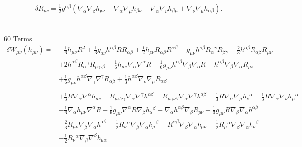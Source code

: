 \documentclass[10pt,letterpaper]{article}
\begin{document}
\begin{equation}
	\delta R_{\mu\nu} = \tfrac{1}{2} g^{\alpha \beta} (\nabla_{\alpha}\nabla_{\beta}h_{\mu \nu} -  \nabla_{\alpha}\nabla_{\mu}h_{\beta \nu} -  \nabla_{\alpha}\nabla_{\nu}h_{\beta \mu} + \nabla_{\nu}\nabla_{\mu}h_{\alpha \beta}).
\end{equation}
\\ \\
60 Terms
\begin{align}
\delta W_{\mu\nu}(h_{\mu\nu})={}&- \tfrac{1}{6} h_{\mu \nu} R^2
 + \tfrac{1}{3} g_{\mu \nu} h^{\alpha \beta} R R_{\alpha \beta}
 + \tfrac{1}{2} h_{\mu \nu} R_{\alpha \beta} R^{\alpha \beta}
 -  g_{\mu \nu} h^{\alpha \beta} R_{\alpha}{}^{\gamma} R_{\beta \gamma}
 -  \tfrac{2}{3} h^{\alpha \beta} R_{\alpha \beta} R_{\mu \nu}\nonumber\\
& + 2 h^{\alpha \beta} R_{\alpha}{}^{\gamma} R_{\mu \gamma \nu \beta}
 -  \tfrac{1}{6} h_{\mu \nu} \nabla_{\alpha}\nabla^{\alpha}R
 + \tfrac{1}{6} g_{\mu \nu} h^{\alpha \beta} \nabla_{\beta}\nabla_{\alpha}R
 -  h^{\alpha \beta} \nabla_{\beta}\nabla_{\alpha}R_{\mu \nu}\nonumber\\
& + \tfrac{1}{6} g_{\mu \nu} h^{\alpha \beta} \nabla_{\gamma}\nabla^{\gamma}R_{\alpha \beta}
 + \tfrac{1}{3} h^{\alpha \beta} \nabla_{\nu}\nabla_{\mu}R_{\alpha \beta} \nonumber \\
\nonumber \\
&+\tfrac{1}{3} R \nabla_{\alpha}\nabla^{\alpha}h_{\mu \nu}
 + R_{\mu \beta \nu \gamma} \nabla_{\alpha}\nabla^{\gamma}h^{\alpha \beta}
 + R_{\mu \gamma \nu \beta} \nabla_{\alpha}\nabla^{\gamma}h^{\alpha \beta}
 -  \tfrac{1}{3} R \nabla_{\alpha}\nabla_{\mu}h_{\nu}{}^{\alpha}
 -  \tfrac{1}{3} R \nabla_{\alpha}\nabla_{\nu}h_{\mu}{}^{\alpha}\nonumber\\
& -  \tfrac{1}{6} \nabla_{\alpha}h_{\mu \nu} \nabla^{\alpha}R
 + \tfrac{1}{6} g_{\mu \nu} \nabla^{\alpha}R \nabla_{\beta}h_{\alpha}{}^{\beta}
 -  \nabla_{\alpha}h^{\alpha \beta} \nabla_{\beta}R_{\mu \nu}
 + \tfrac{1}{3} g_{\mu \nu} R \nabla_{\beta}\nabla_{\alpha}h^{\alpha \beta}\nonumber\\
& -  \tfrac{2}{3} R_{\mu \nu} \nabla_{\beta}\nabla_{\alpha}h^{\alpha \beta}
 + \tfrac{1}{2} R_{\nu}{}^{\alpha} \nabla_{\beta}\nabla_{\alpha}h_{\mu}{}^{\beta}
 -  R^{\alpha \beta} \nabla_{\beta}\nabla_{\alpha}h_{\mu \nu}
 + \tfrac{1}{2} R_{\mu}{}^{\alpha} \nabla_{\beta}\nabla_{\alpha}h_{\nu}{}^{\beta}\nonumber\\
& -  \tfrac{1}{2} R_{\nu}{}^{\alpha} \nabla_{\beta}\nabla^{\beta}h_{\mu \alpha}

\end{align}
\end{document}
